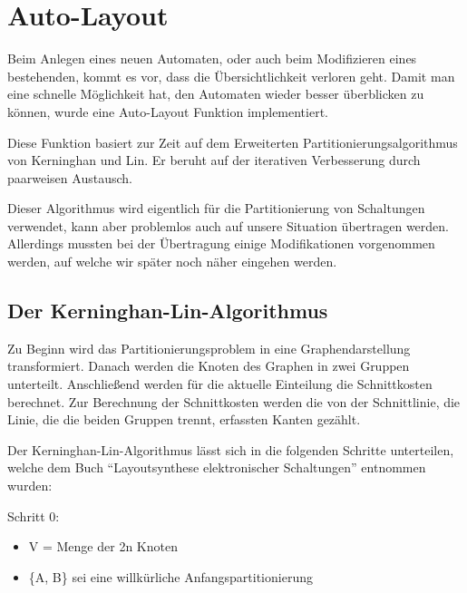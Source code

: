 

\chapter{Auto-Layout}\label{AutoLayout}

Beim Anlegen eines neuen Automaten, oder auch beim Modifizieren eines
bestehenden, kommt es vor, dass die Übersichtlichkeit verloren geht. Damit man
eine schnelle Möglichkeit hat, den Automaten wieder besser überblicken zu
können, wurde eine Auto-Layout Funktion implementiert.\vspace{10pt}

Diese Funktion basiert zur Zeit auf dem Erweiterten Partitionierungsalgorithmus
von Kerninghan und Lin. Er beruht auf der iterativen Verbesserung durch
paarweisen Austausch.\vspace{10pt}

Dieser Algorithmus wird eigentlich für die Partitionierung von Schaltungen
verwendet, kann aber problemlos auch auf unsere Situation übertragen werden.
Allerdings mussten bei der Übertragung einige Modifikationen
vorgenommen werden, auf welche wir später noch näher eingehen
werden.\vspace{10pt}

\section{Der Kerninghan-Lin-Algorithmus}\label{KerninghanLin}

Zu Beginn wird das Partitionierungsproblem in eine Graphendarstellung
transformiert. Danach werden die Knoten des Graphen in zwei Gruppen unterteilt.
Anschließend werden für die aktuelle Einteilung die Schnittkosten berechnet.
Zur Berechnung der Schnittkosten werden die von der Schnittlinie, die Linie, die
die beiden Gruppen trennt, erfassten Kanten gezählt.\vspace{10pt}

Der Kerninghan-Lin-Algorithmus lässt sich in die folgenden Schritte
unterteilen, welche dem Buch "`Layoutsynthese elektronischer
Schaltungen"' \cite{Layout} entnommen wurden:\vspace{10pt}

Schritt 0:
\begin{itemize}
  \item V = Menge der 2n Knoten 
  \item \{A, B\} sei eine willkürliche Anfangspartitionierung
\end{itemize}

